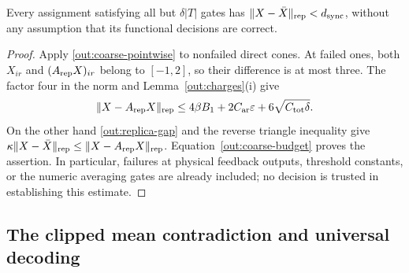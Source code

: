 \begin{lemma}\label{out:coarse-sync}
Every assignment satisfying all but $\delta|T|$ gates has
$\lVert X-\bar X\rVert_{\rm rep}<d_{\rm sync}$, without any assumption that
its functional decisions are correct.
\end{lemma}
\begin{proof}
Apply \eqref{out:coarse-pointwise} to nonfailed direct cones. At failed
ones, both $X_{ir}$ and $(A_{\rm rep}X)_{ir}$ belong to $[-1,2]$, so
their difference is at most three. The factor four in the norm and
Lemma~\ref{out:charges}(i) give
\[
 \lVert X-A_{\rm rep}X\rVert_{\rm rep}
 \leq4\beta B_1+2C_{\rm ar}\varepsilon
                  +6\sqrt{C_{\rm tot}\delta}.
\]
On the other hand \eqref{out:replica-gap} and the reverse triangle
inequality give
$\kappa\lVert X-\bar X\rVert_{\rm rep}
\leq\lVert X-A_{\rm rep}X\rVert_{\rm rep}$.
Equation~\eqref{out:coarse-budget} proves the assertion. In particular,
failures at physical feedback outputs, threshold constants, or the
numeric averaging gates are already included; no decision is trusted
in establishing this estimate.
\end{proof}

\subsection{The clipped mean contradiction and universal decoding}

